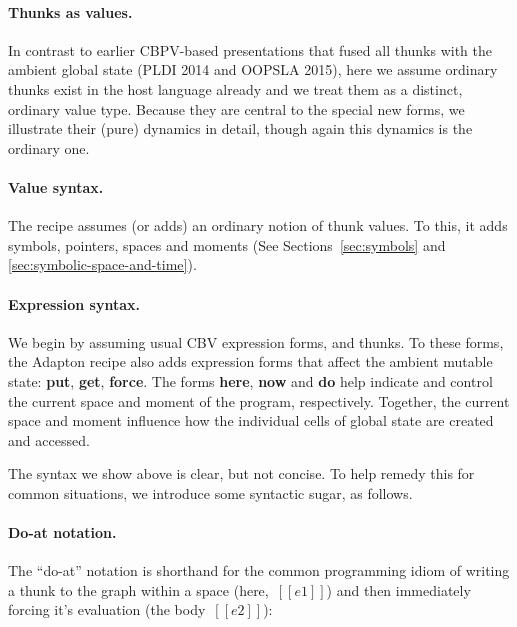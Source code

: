 \documentclass[11pt]{article}
\begin{document}
\paragraph{Thunks as values.}
In contrast to earlier CBPV-based presentations that fused all thunks
with the ambient global state (PLDI 2014 and OOPSLA 2015), here we
assume ordinary thunks exist in the host language already and we treat
them as a distinct, ordinary value type.
%
Because they are central to the special new forms, we illustrate their
(pure) dynamics in detail, though again this dynamics is the ordinary one.

\paragraph{Value syntax.}
The recipe assumes (or adds) an ordinary notion of thunk values.
%
To this, it adds symbols, pointers, spaces and moments (See Sections~\ref{sec:symbols} and \ref{sec:symbolic-space-and-time}).

\ottgrammartabular{
  \ottv
}

\paragraph{Expression syntax.}

We begin by assuming usual CBV expression forms, and thunks.
%
To these forms, the Adapton recipe also adds expression forms that
affect the ambient mutable state: \textbf{put}, \textbf{get}, \textbf{force}.
%
The forms \textbf{here}, \textbf{now} and \textbf{do} help indicate
and control the current space and moment of the program, respectively.
%
Together, the current space and moment influence how the individual
cells of global state are created and accessed.

\ottgrammartabular{
  \otte
}

\ottgrammartabular{
  \ottC
  \\
  \ottCxtVerb
  \\
  \ottCxtDim
}  

\noindent
The syntax we show above is clear, but not concise.
%
To help remedy this for common situations, we introduce some syntactic sugar, as follows.

\paragraph{Do-at notation.}

The ``do-at'' notation is shorthand for the common programming idiom
of writing a thunk to the graph within a space (here,~$[[e1]]$) and then
immediately forcing it's evaluation (the body~$[[e2]]$):
\end{document}
